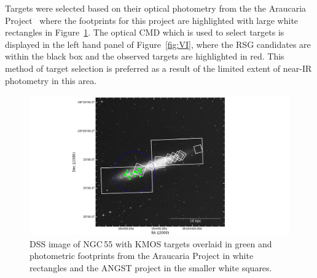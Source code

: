 
Targets were selected based on their optical photometry from the the Araucaria Project~\citep{2005Msngr.121...23G} where the footprints for this project are highlighted with large white rectangles in Figure~\ref{fig:ngc55-foot}.
The optical CMD which is used to select targets is displayed in the left hand panel of Figure~\ref{fig:VI}, where the RSG candidates are within the black box and the observed targets are highlighted in red.
This method of target selection is preferred as a result of the limited extent of near-IR photometry in this area.



\begin{figure}
 \centering
 \includegraphics[width=\textwidth]{ngc55/ngc55_fields-v3}
 \caption[DSS image of NGC\,55 with KMOS and photometric footprints highlighted]{
          DSS image of NGC\,55 with KMOS targets overlaid in green and photometric footprints from the Araucaria Project
          \protect\citep{2005Msngr.121...23G} in white rectangles
          and the ANGST project
          \protect\citep{2009ApJS..183...67D} in the smaller white squares.
         }
 \label{fig:ngc55-foot}
\end{figure}



